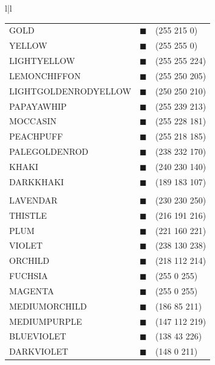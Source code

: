 \begin{table}[t]
{\begin{center}
\begin{tabular}{l|l}
\begin{tabular}{lll}
\\
GOLD					& {\color[RGB]{255,215,0}$\blacksquare$}	& (255 215 0)	\\
YELLOW					& {\color[RGB]{255,255,0}$\blacksquare$}	& (255 255 0)	\\
LIGHTYELLOW				& {\color[RGB]{255,255,224}$\blacksquare$}	& (255 255 224)	\\
LEMONCHIFFON			& {\color[RGB]{255,250,205}$\blacksquare$}	& (255 250 205)	\\
LIGHTGOLDENRODYELLOW	& {\color[RGB]{250,250,210}$\blacksquare$}	& (250 250 210)	\\
PAPAYAWHIP				& {\color[RGB]{255,239,213}$\blacksquare$}	& (255 239 213)	\\
MOCCASIN				& {\color[RGB]{255,228,181}$\blacksquare$}	& (255 228 181)	\\
PEACHPUFF				& {\color[RGB]{255,218,185}$\blacksquare$}	& (255 218 185)	\\
PALEGOLDENROD			& {\color[RGB]{238,232,170}$\blacksquare$}	& (238 232 170)	\\
KHAKI					& {\color[RGB]{240,230,140}$\blacksquare$}	& (240 230 140)	\\
DARKKHAKI				& {\color[RGB]{189,183,107}$\blacksquare$}	& (189 183 107)	\\
\\						
LAVENDAR				& {\color[RGB]{230,230,250}$\blacksquare$}	& (230 230 250)	\\
THISTLE					& {\color[RGB]{216,191,216}$\blacksquare$}	& (216 191 216)	\\
PLUM					& {\color[RGB]{221,160,221}$\blacksquare$}	& (221 160 221)	\\
VIOLET					& {\color[RGB]{238,130,238}$\blacksquare$}	& (238 130 238)	\\
ORCHILD					& {\color[RGB]{218,112,214}$\blacksquare$}	& (218 112 214)	\\
FUCHSIA					& {\color[RGB]{255,0,255}$\blacksquare$}	& (255 0 255)	\\
MAGENTA					& {\color[RGB]{255,0,255}$\blacksquare$}	& (255 0 255)	\\
MEDIUMORCHILD			& {\color[RGB]{186,85,211}$\blacksquare$}	& (186 85 211)	\\
MEDIUMPURPLE			& {\color[RGB]{147,112,219}$\blacksquare$}	& (147 112 219)	\\
BLUEVIOLET				& {\color[RGB]{138,43,226}$\blacksquare$}	& (138 43 226)	\\
DARKVIOLET				& {\color[RGB]{148,0,211}$\blacksquare$}	& (148 0 211)	\\

\end{tabular}
\end{tabular}
\end{center}}
\end{table}
